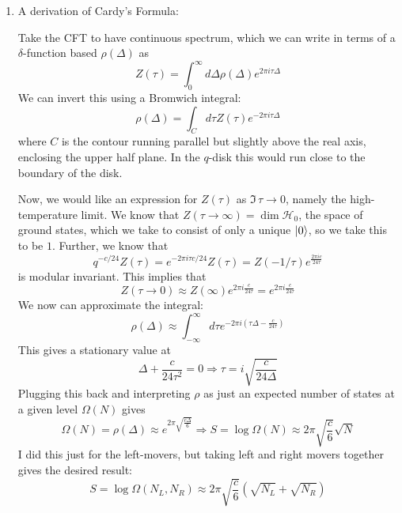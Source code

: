 \documentclass[11pt, class=article, crop=false]{standalone}
\begin{document}
\begin{enumerate}
	Then, the generating function consists of taking products over all $n$ so that for a given $S_N$, the full orbifold is built up from taking all the ways one can partition $N$ in terms of subsectors twisted by $n_i, \sum n_i = N$. Thus, we look for the $q^N$ coefficient in:
	\[
		\prod_{n=1}^\infty \frac{(1+q^n)^f}{(1-q^n)^b}.
	\]
	
	\item A derivation of Cardy's Formula: 
	
	Take the CFT to have continuous spectrum, which we can write in terms of a $\delta$-function based $\rho(\Delta)$ as
	\[
		Z(\tau) = \int_0^\infty d\Delta \rho(\Delta) e^{2 \pi i \tau \Delta}
	\]
	We can invert this using a Bromwich integral:
	\[
		\rho(\Delta) = \int_C d\tau Z(\tau) e^{-2\pi i \tau \Delta}
	\]
	where $C$ is the contour running parallel but slightly above the real axis, enclosing the upper half plane. In the $q$-disk this would run close to the boundary of the disk. 
	
	Now, we would like an expression for $Z(\tau)$ as $\Im \, \tau \to 0$, namely the high-temperature limit. We know that $Z(\tau \to \infty) = \dim \mathcal H_0$, the space of ground states, which we take to consist of only a unique $\ket 0$, so we take this to be $1$. Further, we know that 
	\[
		q^{-c/24} Z(\tau) = e^{-2\pi i \tau c/24} Z(\tau) = Z(-1/\tau) e^{\frac{2\pi i c}{24 \tau}}
	\]
	is modular invariant. This implies that 
	\[
		Z(\tau \to 0) \approx Z(\infty) e^{2 \pi i \frac{c}{24 \tau} } =e^{2 \pi i \frac{c}{24 \tau} } 
	\]
	We now can approximate the integral:
	\[
		\rho(\Delta) \approx \int_{-\infty}^\infty d\tau e^{-2 \pi i (\tau \Delta - \frac{c}{24 \tau})}
	\]
	This gives a stationary value at
	\[
		\Delta + \frac{c}{24 \tau^2} = 0 \Rightarrow \tau = i \sqrt{\frac{c}{24 \Delta}}
	\]
	Plugging this back and interpreting $\rho$ as just an expected number of states at a given level $\Omega(N)$ gives
	\[
		\Omega(N) = \rho(\Delta) \approx e^{2 \pi \sqrt{\frac{c \Delta}{6}}} \Rightarrow S = \log \Omega(N) \approx 2 \pi \sqrt{\frac{c}{6}} \sqrt{N}
	\]
	I did this just for the left-movers, but taking left and right movers together gives the desired result:
	\[
		S = \log \Omega(N_L, N_R) \approx  2 \pi \sqrt{\frac{c}{6}} (\sqrt{N_L} +  \sqrt{N_R})
	\]
	

\end{enumerate}
\end{document}
